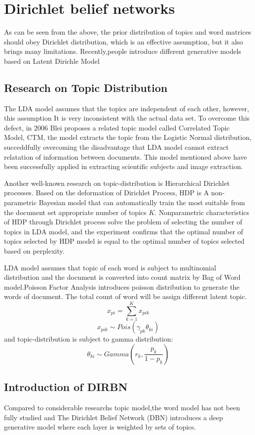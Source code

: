 \section{Dirichlet belief networks}
As can be seen from the above, the prior distribution of topics and word matrices should obey Dirichlet distribution, which is an effective assumption, but it also brings many limitations. Recently,people introduce different generative models based on Latent Dirichle Model
\subsection{Research on Topic Distribution}

The LDA model assumes that the topics are independent of each other, however, this assumption
It is very inconsistent with the actual data set. To overcome this defect, in 2006 Blei proposes a related topic model called Correlated Topic Model,
CTM\cite{corr}, the model extracts the topic from the Logistic Normal distribution, succeddfully overcoming the disadvantage that LDA model cannot extract relatation of  information between documents. This model mentioned
above have been successfully applied in extracting scientific subjects and image extraction.

Another well-known research on topic-distribution is Hierarchical Dirichlet processes\cite{Teh}. Based on the deformation of Dirichlet Process, HDP is A non-parametric Bayesian model that can automatically train the most suitable from the document set appropriate number of topics $K$. Nonparametric characteristics of HDP through Dirichlet process solve the problem of selecting the number of topics in LDA model, and the experiment confirms  that the optimal number of topics selected by HDP model is equal to the optimal number of topics selected based on perplexity.

LDA model assumes that topic of each word is subject to multinomial distribution and the document is converted into count  matrix by Bag of Word model.Poisson Factor Analysis \cite{han}  introduces poisson distribution to generate the words of document. The total count of word will be assign different latent topic.
\[
  x_{pi} = \sum_{k=1}^{K} x_{pik}
\]
\[
  x_{pik} \sim Pois(\gamma_{pk}\theta_{ki})
\]
and topic-distribution is subject to gamma distribution:
\[
  \theta_{ki} \sim Gamma(r_k,\frac{p_k}{1-p_k})
\]

\subsection{Introduction of DIRBN}
Compared to considerable researchs  topic model,the word model has not been fully studied and The Dirichlet Belief Network (DBN)\cite{Zhao} introduces a deep generative model where each layer is weighted by sets of  topics.

